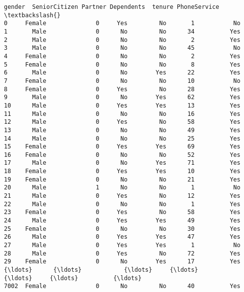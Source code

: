\documentclass[11pt]{article}
\newcommand{\prompt}[4]{
        \llap{{\color{#2}[#3]: #4}}\vspace{-1.25em}
    }
\begin{document}
            \begin{tcolorbox}[breakable, boxrule=.5pt, size=fbox, pad at break*=1mm, opacityfill=0]
\prompt{Out}{outcolor}{6}{\hspace{3.5pt}}
\begin{Verbatim}[commandchars=\\\{\}]
      gender  SeniorCitizen Partner Dependents  tenure PhoneService  \textbackslash{}
0     Female              0     Yes         No       1           No
1       Male              0      No         No      34          Yes
2       Male              0      No         No       2          Yes
3       Male              0      No         No      45           No
4     Female              0      No         No       2          Yes
5     Female              0      No         No       8          Yes
6       Male              0      No        Yes      22          Yes
7     Female              0      No         No      10           No
8     Female              0     Yes         No      28          Yes
9       Male              0      No        Yes      62          Yes
10      Male              0     Yes        Yes      13          Yes
11      Male              0      No         No      16          Yes
12      Male              0     Yes         No      58          Yes
13      Male              0      No         No      49          Yes
14      Male              0      No         No      25          Yes
15    Female              0     Yes        Yes      69          Yes
16    Female              0      No         No      52          Yes
17      Male              0      No        Yes      71          Yes
18    Female              0     Yes        Yes      10          Yes
19    Female              0      No         No      21          Yes
20      Male              1      No         No       1           No
21      Male              0     Yes         No      12          Yes
22      Male              0      No         No       1          Yes
23    Female              0     Yes         No      58          Yes
24      Male              0     Yes        Yes      49          Yes
25    Female              0      No         No      30          Yes
26      Male              0     Yes        Yes      47          Yes
27      Male              0     Yes        Yes       1           No
28      Male              0     Yes         No      72          Yes
29    Female              0      No        Yes      17          Yes
{\ldots}      {\ldots}            {\ldots}     {\ldots}        {\ldots}     {\ldots}          {\ldots}
7002  Female              0      No         No      40          Yes

\end{Verbatim}
\end{tcolorbox}
\end{document}
